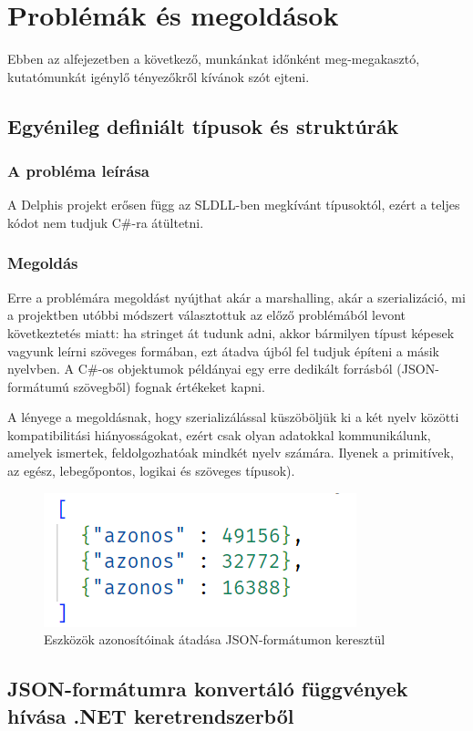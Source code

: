 \documentclass[tocnopagenum]{thesis-ekf}
\begin{document}
	\section{Problémák és megoldások}
	Ebben az alfejezetben a következő, munkánkat időnként meg-megakasztó, kutatómunkát igénylő tényezőkről kívánok szót ejteni.
	\subsection{Egyénileg definiált típusok és struktúrák}
	\subsubsection{A probléma leírása} A Delphis projekt erősen függ az SLDLL-ben megkívánt típusoktól, ezért a teljes kódot nem tudjuk C\#-ra átültetni.
	\subsubsection{Megoldás} 
	Erre a problémára megoldást nyújthat akár a marshalling, akár a szerializáció, mi a projektben utóbbi módszert választottuk az előző problémából levont következtetés miatt: ha stringet át tudunk adni, akkor bármilyen típust képesek vagyunk leírni szöveges formában, ezt átadva újból fel tudjuk építeni a másik nyelvben. A C\#-os objektumok példányai egy erre dedikált forrásból (JSON-formátumú szövegből) fognak értékeket kapni.
	
	A lényege a megoldásnak, hogy szerializálással küszöböljük ki a két nyelv közötti kompatibilitási hiányosságokat, ezért csak olyan adatokkal kommunikálunk, amelyek ismertek, feldolgozhatóak mindkét nyelv számára. Ilyenek a primitívek, az egész, lebegőpontos, logikai és szöveges típusok).
	
	\begin{figure}[h!]
		\centering
		\includegraphics[scale=0.89]{json_szerializalas_azonositok}
		\caption{Eszközök azonosítóinak átadása JSON-formátumon keresztül}
		\label{json_azonositok}
	\end{figure}

	\subsection{JSON-formátumra konvertáló függvények hívása .NET keretrendszerből}
\end{document}
